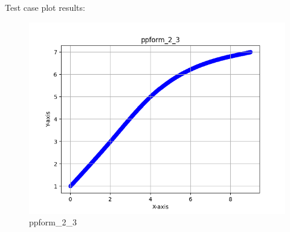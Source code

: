 \documentclass[a4paper]{article}
\begin{document}
Test case plot results:

\begin{figure}[H] 
    \centering
    \includegraphics{../figure/ppform_2_3.png} 
    \caption{ppform\_2\_3} 
\end{figure}
\end{document}
